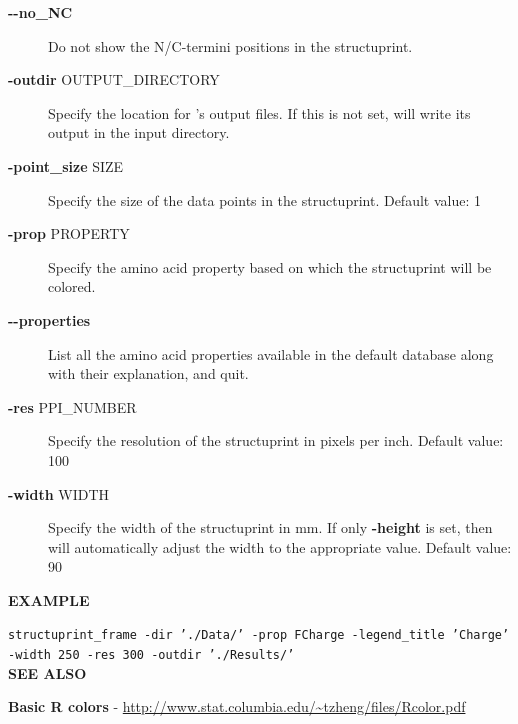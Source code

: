 \documentclass[12pt,a4paper]{article}
\begin{document}
\begin{description}
\item[{\textbf{-{}-no\_NC}}] \mbox{}

Do not show the N/C-termini positions in the structuprint.

\item[{\textbf{-outdir} OUTPUT\_DIRECTORY}] \mbox{}

Specify the location for 's output files. If this is not set,  will write its output in the input directory.

\item[{\textbf{-point\_size} SIZE}] \mbox{}

Specify the size of the data points in the structuprint. Default value: 1

\item[{\textbf{-prop} PROPERTY}] \mbox{}

Specify the amino acid property based on which the structuprint will be colored.

\item[{\textbf{-{}-properties}}] \mbox{}

List all the amino acid properties available in the default database along with their explanation, and quit.

\item[{\textbf{-res} PPI\_NUMBER}] \mbox{}

Specify the resolution of the structuprint in pixels per inch. Default value: 100

\item[{\textbf{-width} WIDTH}] \mbox{}

Specify the width of the structuprint in mm. If only \textbf{-height} is set, then  will automatically adjust the width to the appropriate value. Default value: 90\\

\end{description}
\textbf{\large{EXAMPLE}}

\texttt{structuprint\_frame -dir './Data/' -prop FCharge -legend\_title 'Charge' -width 250 -res 300 -outdir './Results/'}\\

\textbf{\large{SEE ALSO}}
\begin{description}

\item[\textbf{Basic R colors} - \url{http://www.stat.columbia.edu/~tzheng/files/Rcolor.pdf}]

\end{description}
\end{document}
